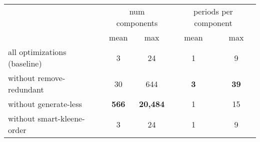 \begin{table}[H]
	\centering
	\begin{tabular}{l c c c c}
		\toprule
		& \multicolumn{2}{c}{num components} & \multicolumn{2}{c}{periods per component} \\
		\cmidrule(lr){2-3} \cmidrule(lr){4-5}
		& mean & max & mean & max \\
		\midrule
	all optimizations (baseline) & 3 & 24 & 1 & 9 \\
	without remove-redundant & 30 & 644 & \textbf{3} & \textbf{39} \\
	without generate-less & \textbf{566} & \textbf{20{,}484} & 1 & 15 \\
	without smart-kleene-order & 3 & 24 & 1 & 9 \\
  \bottomrule
	\end{tabular}
\end{table}
